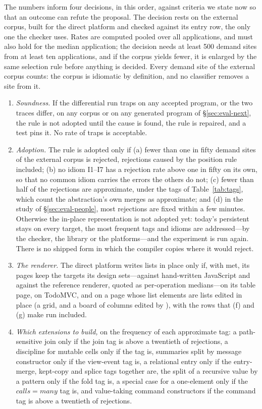 The numbers inform four decisions, in this order, against criteria we state now so that an outcome can
refute the proposal. The decision rests on the external corpus, built for the direct platform and checked
against its entry row, the only one the checker uses. Rates are computed pooled over all applications, and
must also hold for the median application; the decision needs at least 500 demand sites from at least ten
applications, and if the corpus yields fewer, it is enlarged by the same selection rule before anything is
decided. Every demand site of the external corpus counts: the corpus is idiomatic by definition, and no
classifier removes a site from it.
\begin{enumerate}
\item \emph{Soundness.} If the differential run traps on any accepted program, or the two traces differ,
on any corpus or on any generated program of \S\ref{sec:eval-next}, the rule is not adopted until the cause
is found, the rule is repaired, and a test pins it. No rate of traps is acceptable.
\item \emph{Adoption.} The rule is adopted only if (a) fewer than one in fifty demand sites of the external
corpus is rejected, rejections caused by the position rule included; (b) no idiom I1--I7 has a rejection
rate above one in fifty on its own, so that no common idiom carries the errors the others do not;
(c) fewer than half of the rejections are approximate, under the tags of Table~\ref{tab:tags}, which count the
abstraction's own merges as approximate; and (d) in the study of \S\ref{sec:eval-people}, most rejections
are fixed within a few minutes. Otherwise the in-place representation is not adopted yet: today's
persistent  stays on every target, the most frequent tags and idioms are addressed---by the
checker, the library or the platforms---and the experiment is run again. There is no shipped form in which
the compiler copies where it would reject.
\item \emph{The renderer.} The direct platform writes lists in place only if, with  met, its pages
keep the targets its design sets---against hand-written JavaScript and against the reference renderer,
quoted as per-operation medians---on its table page, on TodoMVC, and on a page whose list elements are lists
edited in place (a grid, and a board of columns edited by ), with the rows that (f) and (g)
make run included.
\item \emph{Which extensions to build,} on the frequency of each approximate tag: a path-sensitive join
only if the join tag is above a twentieth of rejections, a discipline for mutable cells only if the
 tag is, summaries split by message constructor only if the view-event tag is, a relational entry
only if the entry-merge, kept-copy and splice tags together are, the split of a
recursive value by a pattern only if the fold tag is, a special case for a one-element  only if the
$\mathit{calls} = \mathit{many}$ tag is, and value-taking command constructors if the command tag is above a
twentieth of rejections.
\end{enumerate}
